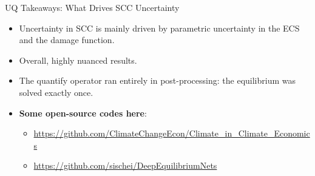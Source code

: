 \documentclass[10pt,aspectratio=169]{beamer}
\begin{document}
\begin{frame}{UQ Takeaways: What Drives SCC Uncertainty}
\begin{itemize}\itemsep6pt
	\item Uncertainty in SCC is mainly driven by parametric uncertainty in the ECS and the damage function.
 	\item Overall, highly nuanced results.
    \item The quantify operator ran entirely in post-processing: the equilibrium was solved exactly once.
    \item \textbf{Some open-source codes here}:
    \begin{itemize}
        \item \url{https://github.com/ClimateChangeEcon/Climate_in_Climate_Economics}
        \item \url{https://github.com/sischei/DeepEquilibriumNets}
    \end{itemize}
\end{itemize}
\end{frame}
\end{document}
